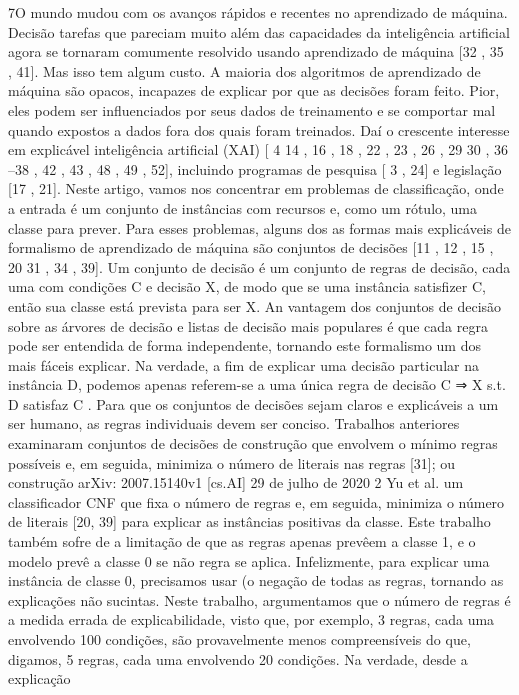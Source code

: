 

7O mundo mudou com os avanços rápidos e recentes no aprendizado de máquina. Decisão
tarefas que pareciam muito além das capacidades da inteligência artificial agora se tornaram
comumente resolvido usando aprendizado de máquina [32
, 35
, 41]. Mas isso tem algum custo.
A maioria dos algoritmos de aprendizado de máquina são opacos, incapazes de explicar por que as decisões foram
feito. Pior, eles podem ser influenciados por seus dados de treinamento e se comportar mal quando expostos
a dados fora dos quais foram treinados. Daí o crescente interesse em explicável
inteligência artificial (XAI) [
4
14
, 16
, 18
, 22
, 23
, 26
, 29
30
, 36
–38
, 42
, 43
, 48
, 49
, 52],
incluindo programas de pesquisa [
3
, 24] e legislação [17
, 21].
Neste artigo, vamos nos concentrar em problemas de classificação, onde a entrada é um conjunto de
instâncias com recursos e, como um rótulo, uma classe para prever. Para esses problemas, alguns dos
as formas mais explicáveis ​​de formalismo de aprendizado de máquina são conjuntos de decisões
[11
, 12
,
15
, 20
31
, 34
, 39]. Um conjunto de decisão é um conjunto de regras de decisão, cada uma com condições
C e
decisão
X, de modo que se uma instância satisfizer
C, então sua classe está prevista para ser
X. An
vantagem dos conjuntos de decisão sobre as árvores de decisão e listas de decisão mais populares é que
cada regra pode ser entendida de forma independente, tornando este formalismo um dos mais fáceis
explicar. Na verdade, a fim de explicar uma decisão particular na instância
D, podemos apenas
referem-se a uma única regra de decisão
C
⇒
X s.t.
D satisfaz
C
.
Para que os conjuntos de decisões sejam claros e explicáveis ​​a um ser humano, as regras individuais devem ser
conciso. Trabalhos anteriores examinaram conjuntos de decisões de construção que envolvem o mínimo
regras possíveis e, em seguida, minimiza o número de literais nas regras [31]; ou construção
arXiv: 2007.15140v1 [cs.AI] 29 de julho de 2020
2 Yu et al.
um classificador CNF que fixa o número de regras e, em seguida, minimiza o número de literais [20, 39] para explicar as instâncias positivas da classe. Este trabalho também sofre de
a limitação de que as regras apenas prevêem a classe 1, e o modelo prevê a classe 0 se não
regra se aplica. Infelizmente, para explicar uma instância de classe 0, precisamos usar (o
negação de todas as regras, tornando as explicações não sucintas.
Neste trabalho, argumentamos que o número de regras é a medida errada de explicabilidade,
visto que, por exemplo, 3 regras, cada uma envolvendo 100 condições, são provavelmente menos compreensíveis do que, digamos, 5 regras, cada uma envolvendo 20 condições. Na verdade, desde a explicação
